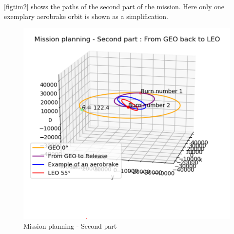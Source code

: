 \autoref{figtim2} shows the paths of the second part of the mission. Here only one exemplary aerobrake orbit is shown as a simplification.
\begin{figure}[H]
	\centering\includegraphics[width=0.7\linewidth]{mission2}
	\caption{Mission planning - Second part}\label{figtim2}
\end{figure}